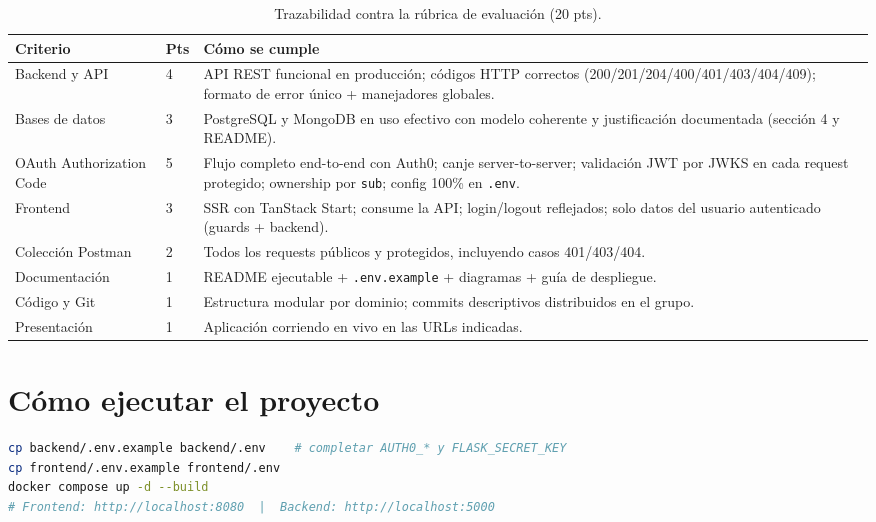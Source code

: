 \documentclass{article}
\begin{document}
\begin{table}[H]
\setlength{\tabcolsep}{0.4em}
{\renewcommand{\arraystretch}{1.25}
\footnotesize
\begin{tabular}{|p{4.1cm}|x{1cm}|p{9.6cm}|}
    \hline
    \color{white}\textbf{Criterio} & \color{white}\textbf{Pts} & \color{white}\textbf{Cómo se cumple} \\
    \hline
    Backend y API & 4 & API REST funcional en producción; códigos HTTP correctos (200/201/204/400/401/403/404/409); formato de error único + manejadores globales. \\
    \hline
    Bases de datos & 3 & PostgreSQL y MongoDB en uso efectivo con modelo coherente y justificación documentada (sección 4 y README). \\
    \hline
    OAuth Authorization Code & 5 & Flujo completo end-to-end con Auth0; canje server-to-server; validación JWT por JWKS en cada request protegido; ownership por \texttt{sub}; config 100\% en \texttt{.env}. \\
    \hline
    Frontend & 3 & SSR con TanStack Start; consume la API; login/logout reflejados; solo datos del usuario autenticado (guards + backend). \\
    \hline
    Colección Postman & 2 & Todos los requests públicos y protegidos, incluyendo casos 401/403/404. \\
    \hline
    Documentación & 1 & README ejecutable + \texttt{.env.example} + diagramas + guía de despliegue. \\
    \hline
    Código y Git & 1 & Estructura modular por dominio; commits descriptivos distribuidos en el grupo. \\
    \hline
    Presentación & 1 & Aplicación corriendo en vivo en las URLs indicadas. \\
    \hline
\end{tabular}}
\caption{Trazabilidad contra la rúbrica de evaluación (20 pts).}
\end{table}

\section{Cómo ejecutar el proyecto}

\begin{lstlisting}[language=bash,caption={Arranque local con Docker}]
cp backend/.env.example backend/.env    # completar AUTH0_* y FLASK_SECRET_KEY
cp frontend/.env.example frontend/.env
docker compose up -d --build
# Frontend: http://localhost:8080  |  Backend: http://localhost:5000
\end{lstlisting}
\end{document}
